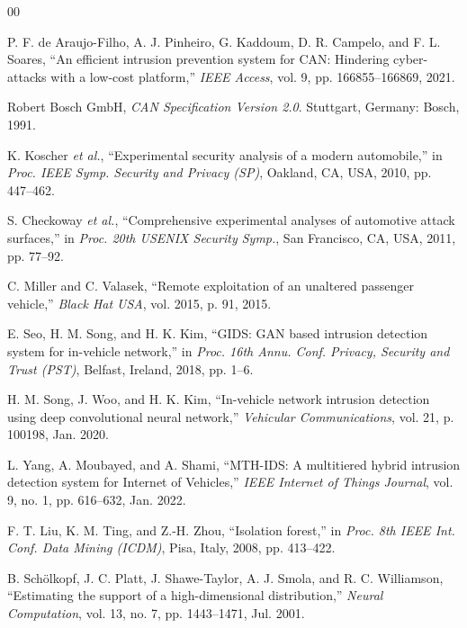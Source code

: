 \documentclass[conference]{IEEEtran}
\begin{document}
\begin{thebibliography}{00}

P. F. de Araujo-Filho, A. J. Pinheiro, G. Kaddoum, D. R. Campelo, and F. L. Soares, ``An efficient intrusion prevention system for CAN: Hindering cyber-attacks with a low-cost platform,'' \textit{IEEE Access}, vol. 9, pp. 166855--166869, 2021.

Robert Bosch GmbH, \textit{CAN Specification Version 2.0}. Stuttgart, Germany: Bosch, 1991.

K. Koscher \textit{et al.}, ``Experimental security analysis of a modern automobile,'' in \textit{Proc. IEEE Symp. Security and Privacy (SP)}, Oakland, CA, USA, 2010, pp. 447--462.

S. Checkoway \textit{et al.}, ``Comprehensive experimental analyses of automotive attack surfaces,'' in \textit{Proc. 20th USENIX Security Symp.}, San Francisco, CA, USA, 2011, pp. 77--92.

C. Miller and C. Valasek, ``Remote exploitation of an unaltered passenger vehicle,'' \textit{Black Hat USA}, vol. 2015, p. 91, 2015.

E. Seo, H. M. Song, and H. K. Kim, ``GIDS: GAN based intrusion detection system for in-vehicle network,'' in \textit{Proc. 16th Annu. Conf. Privacy, Security and Trust (PST)}, Belfast, Ireland, 2018, pp. 1--6.

H. M. Song, J. Woo, and H. K. Kim, ``In-vehicle network intrusion detection using deep convolutional neural network,'' \textit{Vehicular Communications}, vol. 21, p. 100198, Jan. 2020.

L. Yang, A. Moubayed, and A. Shami, ``MTH-IDS: A multitiered hybrid intrusion detection system for Internet of Vehicles,'' \textit{IEEE Internet of Things Journal}, vol. 9, no. 1, pp. 616--632, Jan. 2022.

F. T. Liu, K. M. Ting, and Z.-H. Zhou, ``Isolation forest,'' in \textit{Proc. 8th IEEE Int. Conf. Data Mining (ICDM)}, Pisa, Italy, 2008, pp. 413--422.

B. Sch{\"o}lkopf, J. C. Platt, J. Shawe-Taylor, A. J. Smola, and R. C. Williamson, ``Estimating the support of a high-dimensional distribution,'' \textit{Neural Computation}, vol. 13, no. 7, pp. 1443--1471, Jul. 2001.


\end{thebibliography}
\end{document}
